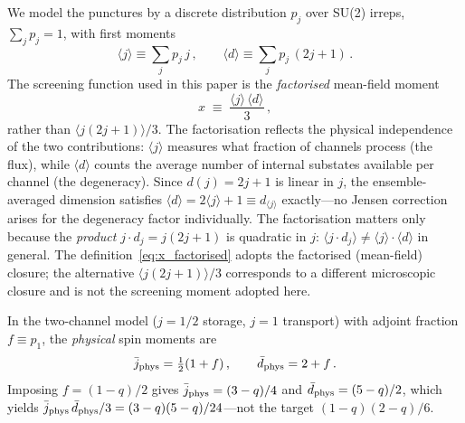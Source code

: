 \documentclass[aps,prd,twocolumn,10pt,superscriptaddress,nofootinbib]{revtex4-2}
\begin{document}
We model the punctures by a discrete distribution $p_j$ over
SU(2) irreps, $\sum_j p_j = 1$, with first moments
\begin{equation}
\langle j \rangle \equiv \sum_j p_j\,j\,,\qquad
\langle d \rangle \equiv \sum_j p_j\,(2j+1)\,.
\label{eq:discrete_moments}
\end{equation}
The screening function used in this paper is the
\emph{factorised} mean-field moment
\begin{equation}
x \;\equiv\; \frac{\langle j \rangle\,\langle d \rangle}{3}\,,
\label{eq:x_factorised}
\end{equation}
rather than $\langle j(2j+1) \rangle/3$.  The factorisation
reflects the physical independence of the two contributions:
$\langle j \rangle$ measures what fraction of channels process
(the flux), while $\langle d \rangle$ counts the average number
of internal substates available per channel (the degeneracy).
Since $d(j) = 2j+1$ is linear in $j$, the ensemble-averaged
dimension satisfies
$\langle d \rangle = 2\langle j \rangle + 1 \equiv d_{\langle
j \rangle}$ exactly---no Jensen correction arises for the
degeneracy factor individually.  The factorisation matters only
because the \emph{product} $j \cdot d_j = j(2j+1)$ is quadratic
in $j$: $\langle j \cdot d_j \rangle \neq \langle j \rangle
\cdot \langle d \rangle$ in general.  The definition~\eqref{eq:x_factorised} adopts the factorised (mean-field)
closure; the alternative $\langle j(2j+1) \rangle/3$ corresponds
to a different microscopic closure and is not the screening moment
adopted here.

In the two-channel model ($j = 1/2$ storage, $j = 1$ transport)
with adjoint fraction $f \equiv p_1$, the \emph{physical} spin
moments are
\begin{equation}
\bar{j}_{\rm phys} = \tfrac{1}{2}(1 + f)\,,\qquad
\bar{d}_{\rm phys} = 2 + f\,.
\label{eq:moments_phys}
\end{equation}
Imposing $f = (1-q)/2$ gives $\bar{j}_{\rm phys} = (3-q)/4$ and
$\bar{d}_{\rm phys} = (5-q)/2$, which yields
$\bar{j}_{\rm phys}\,\bar{d}_{\rm phys}/3 = (3-q)(5-q)/24$---not
the target $(1-q)(2-q)/6$.
\end{document}

